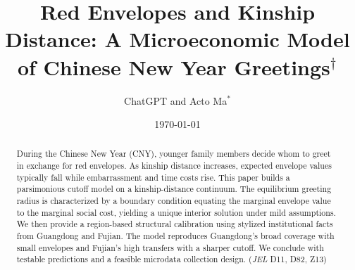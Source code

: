 \documentclass[AER]{AEA}
\begin{document}
\title{Red Envelopes and Kinship Distance: A Microeconomic Model of Chinese New Year Greetings$^\dagger$}

\author{ChatGPT and Acto Ma$^*$}
\date{\today}

\begin{abstract}
During the Chinese New Year (CNY), younger family members decide whom to greet in exchange for red envelopes. As kinship distance increases, expected envelope values typically fall while embarrassment and time costs rise. This paper builds a parsimonious cutoff model on a kinship-distance continuum. The equilibrium greeting radius is characterized by a boundary condition equating the marginal envelope value to the marginal social cost, yielding a unique interior solution under mild assumptions. We then provide a region-based structural calibration using stylized institutional facts from Guangdong and Fujian. The model reproduces Guangdong's broad coverage with small envelopes and Fujian's high transfers with a sharper cutoff. We conclude with testable predictions and a feasible microdata collection design.
\noindent (\textit{JEL} D11, D82, Z13)
\end{abstract}

\maketitle

\let\thefootnote\relax{}
\let\thefootnote\relax{}

\def\thefootnote{\arabic{footnote}}
\setcounter{footnote}{0}

\end{document}
